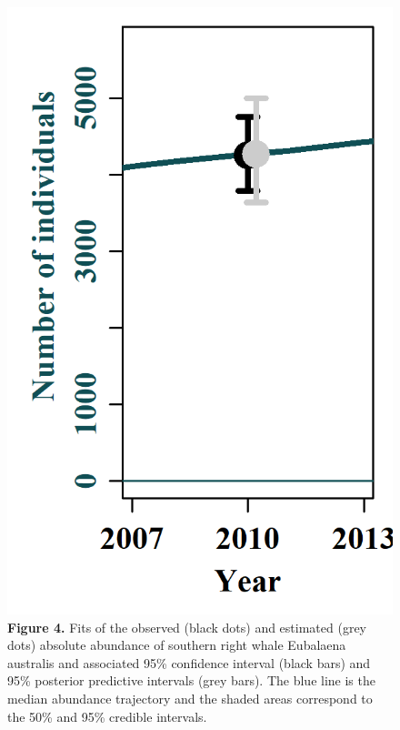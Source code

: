 \documentclass[
]{article}
\begin{document}
\begin{figure}
\centering
\includegraphics{Model runs/Model_average/Model_average_abs_abundance_fit.png}
\caption{\textbf{Figure 4.} Fits of the observed (black dots) and
estimated (grey dots) absolute abundance of southern right whale
Eubalaena australis and associated 95\% confidence interval (black bars)
and 95\% posterior predictive intervals (grey bars). The blue line is
the median abundance trajectory and the shaded areas correspond to the
50\% and 95\% credible intervals.}
\end{figure}
\end{document}
